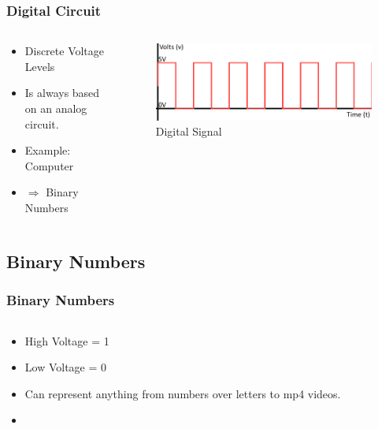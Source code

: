 \documentclass{beamer}
\begin{document}
\begin{frame}\frametitle{Digital Circuit}
  \begin{columns}
  \begin{column}{6cm}
  \begin{itemize}
   \item Discrete Voltage Levels
   \item Is always based on an analog circuit.
   \item Example: Computer
   \item $\Rightarrow$ Binary Numbers

  \end{itemize}


  \end{column}
  \begin{column}{6cm}
  \begin{figure}
  \includegraphics[width=1\textwidth]{digital}
  \caption{Digital Signal}
  \end{figure}
  \end{column}
  \end{columns}
\end{frame}


\subsection{Binary Numbers}
\begin{frame}\frametitle{Binary Numbers}
  \begin{columns}
  \begin{column}{6cm}
  \begin{itemize}
   \item<1-> High Voltage = 1
   \item<1-> Low Voltage = 0
   \item<1-> Can represent anything from numbers over letters to mp4 videos.
   \item 
  \end{itemize}

  \end{column}
  \begin{column}{6cm}
  \end{column}
  \end{columns}
\end{frame}
\end{document}
